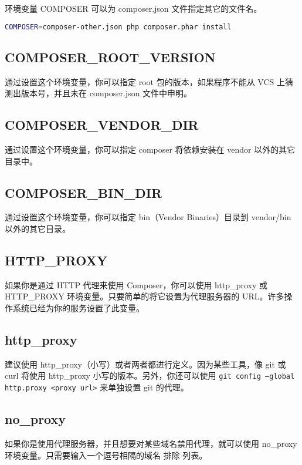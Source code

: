 环境变量 COMPOSER 可以为 composer.json 文件指定其它的文件名。

\begin{lstlisting}[language=bash]
COMPOSER=composer-other.json php composer.phar install
\end{lstlisting}

\subsection{COMPOSER\_ROOT\_VERSION}

通过设置这个环境变量，你可以指定 root 包的版本，如果程序不能从 VCS 上猜测出版本号，并且未在 composer.json 文件中申明。

\subsection{COMPOSER\_VENDOR\_DIR}

通过设置这个环境变量，你可以指定 composer 将依赖安装在 vendor 以外的其它目录中。


\subsection{COMPOSER\_BIN\_DIR}

通过设置这个环境变量，你可以指定 bin（Vendor Binaries）目录到 vendor/bin 以外的其它目录。


\subsection{HTTP\_PROXY}

如果你是通过 HTTP 代理来使用 Composer，你可以使用 http\_proxy 或 HTTP\_PROXY 环境变量。只要简单的将它设置为代理服务器的 URL。许多操作系统已经为你的服务设置了此变量。

\subsection{http\_proxy}


建议使用 http\_proxy（小写）或者两者都进行定义。因为某些工具，像 git 或 curl 将使用 http\_proxy 小写的版本。另外，你还可以使用 \texttt{git config --global http.proxy <proxy url>} 来单独设置 git 的代理。


\subsection{no\_proxy}

如果你是使用代理服务器，并且想要对某些域名禁用代理，就可以使用 no\_proxy 环境变量。只需要输入一个逗号相隔的域名 排除 列表。

